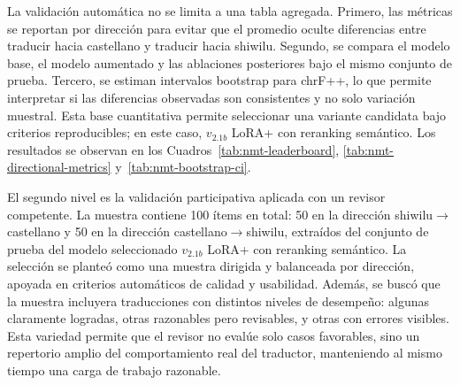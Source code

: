 \documentclass[12pt,a4paper,oneside]{book}
\begin{document}
La validación automática no se limita a una tabla agregada. Primero, las métricas se reportan por dirección para evitar que el promedio oculte diferencias entre traducir hacia castellano y traducir hacia shiwilu. Segundo, se compara el modelo base, el modelo aumentado y las ablaciones posteriores bajo el mismo conjunto de prueba. Tercero, se estiman intervalos bootstrap para chrF++, lo que permite interpretar si las diferencias observadas son consistentes y no solo variación muestral. Esta base cuantitativa permite seleccionar una variante candidata bajo criterios reproducibles; en este caso, \(v_{2.1b}\) LoRA+ con reranking semántico. Los resultados se observan en los Cuadros~\ref{tab:nmt-leaderboard}, \ref{tab:nmt-directional-metrics} y~\ref{tab:nmt-bootstrap-ci}.

El segundo nivel es la validación participativa aplicada con un revisor competente. La muestra contiene 100 ítems en total: 50 en la dirección shiwilu\(\rightarrow\)castellano y 50 en la dirección castellano\(\rightarrow\)shiwilu, extraídos del conjunto de prueba del modelo seleccionado \(v_{2.1b}\) LoRA+ con reranking semántico. La selección se planteó como una muestra dirigida y balanceada por dirección, apoyada en criterios automáticos de calidad y usabilidad. Además, se buscó que la muestra incluyera traducciones con distintos niveles de desempeño: algunas claramente logradas, otras razonables pero revisables, y otras con errores visibles. Esta variedad permite que el revisor no evalúe solo casos favorables, sino un repertorio amplio del comportamiento real del traductor, manteniendo al mismo tiempo una carga de trabajo razonable.
\end{document}
